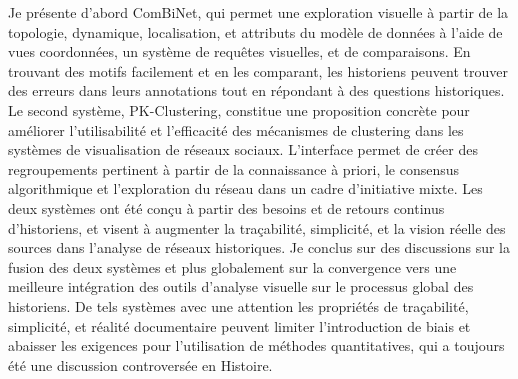 {    Je présente d'abord ComBiNet, qui permet une exploration visuelle à partir de la topologie, dynamique, localisation, et attributs du modèle de données à l'aide de vues coordonnées, un système de requêtes visuelles, et de comparaisons.
    En trouvant des motifs facilement et en les comparant, les historiens peuvent trouver des erreurs dans leurs annotations tout en répondant à des questions historiques.
    Le second système, PK-Clustering, constitue une proposition concrète pour améliorer l'utilisabilité et l'efficacité des mécanismes de clustering dans les systèmes de visualisation de réseaux sociaux.
    L'interface permet de créer des regroupements pertinent à partir de la connaissance à priori, le consensus algorithmique et l'exploration du réseau dans un cadre d'initiative mixte.
    Les deux systèmes ont été conçu à partir des besoins et de retours continus d'historiens, et visent à augmenter la traçabilité, simplicité, et la vision réelle des sources dans l'analyse de réseaux historiques.
    Je conclus sur des discussions sur la fusion des deux systèmes et plus globalement sur la convergence vers une meilleure intégration des outils d'analyse visuelle sur le processus global des historiens.
    De tels systèmes avec une attention les propriétés de traçabilité, simplicité, et réalité documentaire peuvent limiter l'introduction de biais et abaisser les exigences pour l'utilisation de méthodes quantitatives, qui a toujours été une discussion controversée en Histoire.
}


